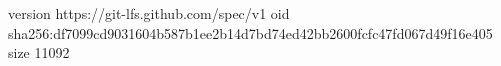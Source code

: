 version https://git-lfs.github.com/spec/v1
oid sha256:df7099cd9031604b587b1ee2b14d7bd74ed42bb2600fcfc47fd067d49f16e405
size 11092
